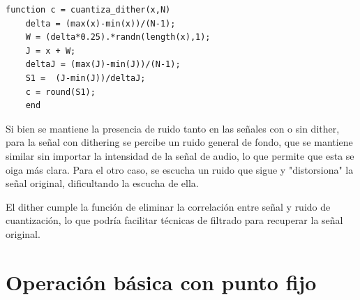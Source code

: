 \documentclass[letterpaper,onecolumn,10pt,journal,final]{IEEEtran}
\begin{document}
\begin{enumerate}[{1)}]
     \begin{lstlisting}[frame=single]
    function c = cuantiza_dither(x,N)
    delta = (max(x)-min(x))/(N-1);
    W = (delta*0.25).*randn(length(x),1);
    J = x + W;
    deltaJ = (max(J)-min(J))/(N-1);
    S1 =  (J-min(J))/deltaJ;
    c = round(S1);
    end
    \end{lstlisting}
    
    Si bien se mantiene la presencia de ruido tanto en las señales con o sin dither, para la señal con dithering se percibe un ruido general de fondo, que se mantiene similar sin importar la intensidad de la señal de audio, lo que permite que esta se oiga más clara. Para el otro caso, se escucha un ruido que sigue y "distorsiona" la señal original, dificultando la escucha de ella.
    
    El dither cumple la función de eliminar la correlación entre señal y ruido de cuantización, lo que podría facilitar técnicas de filtrado para recuperar la señal original.
    
\end{enumerate}

%
%
\section{Operación básica con punto fijo}
\end{document}
